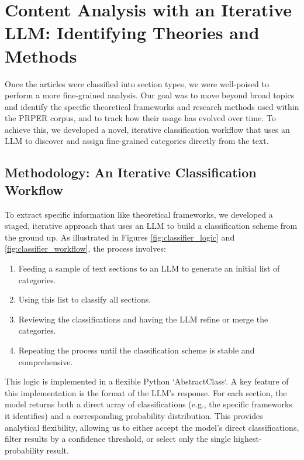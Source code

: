 \section{Content Analysis with an Iterative LLM: Identifying Theories and Methods}

Once the articles were classified into section types, we were well-poised to
perform a more fine-grained analysis. Our goal was to move beyond broad topics
and identify the specific theoretical frameworks and research methods used
within the PRPER corpus, and to track how their usage has evolved over time. To
achieve this, we developed a novel, iterative classification workflow that uses
an LLM to discover and assign fine-grained categories directly from the text.

\subsection{Methodology: An Iterative Classification Workflow}

To extract specific information like theoretical frameworks, we developed a
staged, iterative approach that uses an LLM to build a classification scheme
from the ground up. As illustrated in Figures \ref{fig:classifier_logic} and
\ref{fig:classifier_workflow}, the process involves:
\begin{enumerate}
    \item Feeding a sample of text sections to an LLM to generate an initial
    list of categories.
    \item Using this list to classify all sections.
    \item Reviewing the classifications and having the LLM refine or merge the
    categories.
    \item Repeating the process until the classification scheme is stable and
    comprehensive.
\end{enumerate}
This logic is implemented in a flexible Python `AbstractClass`. A key feature of
this implementation is the format of the LLM's response. For each section, the
model returns both a direct array of classifications (e.g., the specific
frameworks it identifies) and a corresponding probability distribution. This
provides analytical flexibility, allowing us to either accept the model's direct
classifications, filter results by a confidence threshold, or select only the
single highest-probability result.

